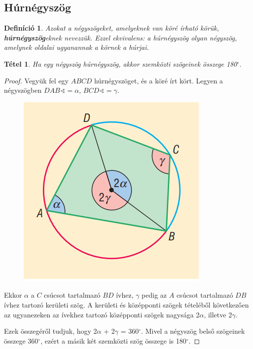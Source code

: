 \documentclass[12pt,a4paper]{article}
\newtheorem{theorem}{Tétel} [section]
\newtheorem{definition}{Definíció} [section]
\begin{document}
\subsection{Húrnégyszög}

\begin{definition}
Azokat a négyszögeket, amelyeknek van köré írható körük, \textbf{húrnégyszög}eknek nevezzük. Ezzel ekvivalens: a húrnégyszög olyan négyszög, amelynek oldalai ugyanannak a körnek a húrjai.
\end{definition}

\begin{theorem}
 Ha egy négyszög húrnégyszög, akkor szemközti szögeinek összege 180$^\circ$.
\end{theorem}
\begin{proof}
Vegyük fel egy $ABCD$ húrnégyszöget, és a köré írt kört. Legyen a négyszögben $DAB \sphericalangle=\alpha$, $BCD \sphericalangle=\gamma$.
\begin{figure}[h]
\centering
\includegraphics[scale=0.4]{geometry/hurnegyszog}
\end{figure}

Ekkor $\alpha$ a $C$ csúcsot tartalmazó $BD$ ívhez, $\gamma$ pedig az $A$ csúcsot tartalmazó $DB$ ívhez tartozó kerületi szög. A kerületi és középponti szögek tételéből következően az ugyanezeken az ívekhez tartozó középponti szögek nagysága 2$\alpha$, illetve 2$\gamma$.

Ezek összegéről tudjuk, hogy 2$\alpha$ + 2$\gamma$ = 360$^\circ$. Mivel a négyszög belső szögeinek összege 360$^\circ$, ezért a másik két szemközti szög összege is 180$^\circ$.
\end{proof}
\end{document}
